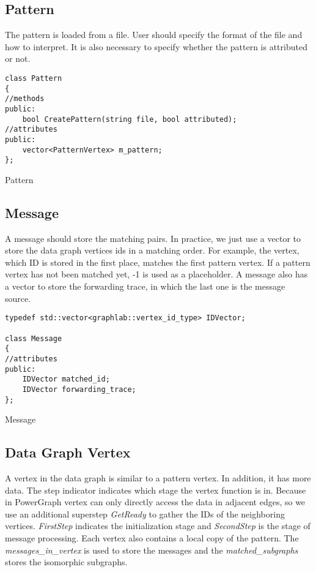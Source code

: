 \subsection{Pattern}

The pattern is loaded from a file. User should specify the format of the file and how to interpret. It is also necessary to specify whether the pattern is attributed or not.

\begin{Listing}[H]
\begin{lstlisting}
class Pattern
{
//methods
public:
	bool CreatePattern(string file, bool attributed);
//attributes
public:
	vector<PatternVertex> m_pattern;
};
\end{lstlisting}
\caption{Pattern}
\label{lst:Pattern}
\end{Listing}

\subsection{Message}

A message should store the matching pairs. In practice, we just use a vector to store the data graph vertices ids in a matching order. For example, the vertex, which ID is stored in the first place, matches the first pattern vertex. If a pattern vertex has not been matched yet, -1 is used as a placeholder. A message also has a vector to store the forwarding trace, in which the last one is the message source.

\begin{Listing}[H]
\begin{lstlisting}
typedef std::vector<graphlab::vertex_id_type> IDVector;

class Message
{
//attributes
public:
	IDVector matched_id;
	IDVector forwarding_trace;
};
\end{lstlisting}
\caption{Message}
\label{lst:Message}
\end{Listing}

\subsection{Data Graph Vertex}

A vertex in the data graph is similar to a pattern vertex. In addition, it has more data. The step indicator indicates which stage the vertex function is in. Because in PowerGraph vertex can only directly access the data in adjacent edges, so we use an additional superstep \textit{GetReady} to gather the IDs of the neighboring vertices. \textit{FirstStep} indicates the initialization stage and \textit{SecondStep} is the stage of message processing. Each vertex also contains a local copy of the pattern. The \textit{messages\_in\_vertex} is used to store the messages and the \textit{matched\_subgraphs} stores the isomorphic subgraphs. 

